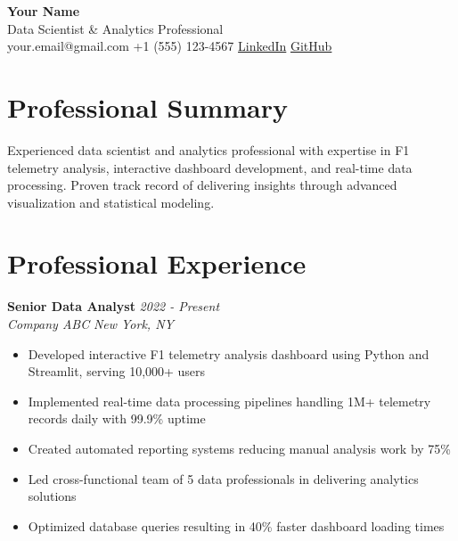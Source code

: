 \documentclass[letterpaper,11pt]{article}
\begin{document}
\begin{center}
    {\huge \textbf{\textcolor{primarycolor}{Your Name}}}\\[0.3cm]
    {\large Data Scientist \& Analytics Professional}\\[0.5cm]
    
    \faEnvelope \hspace{0.1cm} your.email@gmail.com \hspace{0.5cm}
    \faPhone \hspace{0.1cm} +1 (555) 123-4567 \hspace{0.5cm}
    \faLinkedin \hspace{0.1cm} \href{https://linkedin.com/in/yourprofile}{LinkedIn} \hspace{0.5cm}
    \faGithub \hspace{0.1cm} \href{https://github.com/yourusername}{GitHub}
\end{center}

\vspace{0.5cm}

\section*{\textcolor{primarycolor}{Professional Summary}}
Experienced data scientist and analytics professional with expertise in F1 telemetry analysis, 
interactive dashboard development, and real-time data processing. Proven track record of 
delivering insights through advanced visualization and statistical modeling.

\section*{\textcolor{primarycolor}{Professional Experience}}

\textbf{Senior Data Analyst} \hfill \textit{2022 - Present}\\
\textit{Company ABC} \hfill \textit{New York, NY}
\begin{itemize}[leftmargin=0.5in]
    \item Developed interactive F1 telemetry analysis dashboard using Python and Streamlit, serving 10,000+ users
    \item Implemented real-time data processing pipelines handling 1M+ telemetry records daily with 99.9\% uptime
    \item Created automated reporting systems reducing manual analysis work by 75\%
    \item Led cross-functional team of 5 data professionals in delivering analytics solutions
    \item Optimized database queries resulting in 40\% faster dashboard loading times
\end{itemize}
\end{document}
